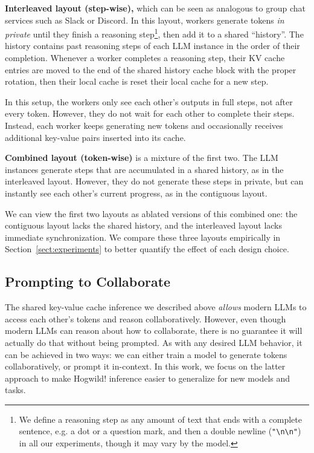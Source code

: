 \textbf{Interleaved layout (step-wise),} which can be seen as analogous to group chat services such as Slack or Discord. In this layout, workers generate tokens \textit{in private} until they finish a reasoning step\footnote[6]{We define a reasoning step as any amount of text that ends with a complete sentence, e.g. a dot or a question mark, and then a double newline (\texttt{"\textbackslash n\textbackslash n"}) in all our experiments, though it may vary by the model.}, then add it to a shared ``history''.
The history contains past reasoning steps of each LLM instance in the order of their completion. Whenever a worker completes a reasoning step, their KV cache entries are moved to the end of the shared history cache block with the proper rotation, then their local cache is reset their local cache for a new step.

In this setup, the workers only see each other's outputs in full steps, not after every token. However, they do not wait for each other to complete their steps. Instead, each worker keeps generating new tokens and occasionally receives additional key-value pairs inserted into its cache.

\textbf{Combined layout (token-wise)} is a mixture of the first two.
The LLM instances 
generate steps that are accumulated in a shared history, as in the interleaved layout. However, they do not generate these steps in private, but can instantly see each other's current progress, as in the contiguous layout.

We can view the first two layouts as ablated versions of this combined one: the contiguous layout lacks the shared history, and the interleaved layout lacks immediate synchronization. We compare these three layouts empirically in Section~\ref{sect:experiments} to better quantify the effect of each design choice.




\vspace{-5px}\subsection{Prompting to Collaborate}\label{sect:method_prompting}\vspace{-5px}

The shared key-value cache inference we described above \textit{allows} modern LLMs to access each other's tokens and reason collaboratively. However, even though modern LLMs can reason about how to collaborate, there is no guarantee it will actually do that without being prompted. As with any desired LLM behavior, it can be achieved in two ways: we can either train a model to generate tokens collaboratively, or prompt it in-context. In this work, we focus on the latter approach to make Hogwild! inference easier to generalize for new models and tasks.


